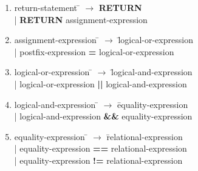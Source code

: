 \documentclass[12pt]{article}
\begin{document}
\begin{enumerate}
\item \begin{tabbing} return-statement \= $\rightarrow$ \= \textbf{RETURN} \\
	\> \hspace*{0.05cm} | \> \textbf{RETURN} assignment-expression \\
\end{tabbing}

\item \begin{tabbing} assignment-expression \= $\rightarrow$ \= logical-or-expression \\
	\> \hspace*{0.05cm} | \> postfix-expression \textbf{=} logical-or-expression \\
\end{tabbing}

\item \begin{tabbing} logical-or-expression \= $\rightarrow$ \= logical-and-expression \\
	\> \hspace*{0.05cm} | \> logical-or-expression \textbf{||} logical-and-expression \\
\end{tabbing}

\item \begin{tabbing} logical-and-expression \= $\rightarrow$ \= equality-expression \\
	\> \hspace*{0.05cm} | \> logical-and-expression \textbf{\&\&} equality-expression \\
\end{tabbing}

\item \begin{tabbing} equality-expression \= $\rightarrow$ \= relational-expression \\
	\> \hspace*{0.05cm} | \> equality-expression \textbf{==} relational-expression \\
	\> \hspace*{0.05cm} | \> equality-expression \textbf{!=} relational-expression \\
\end{tabbing}


\end{enumerate}
\end{document}
